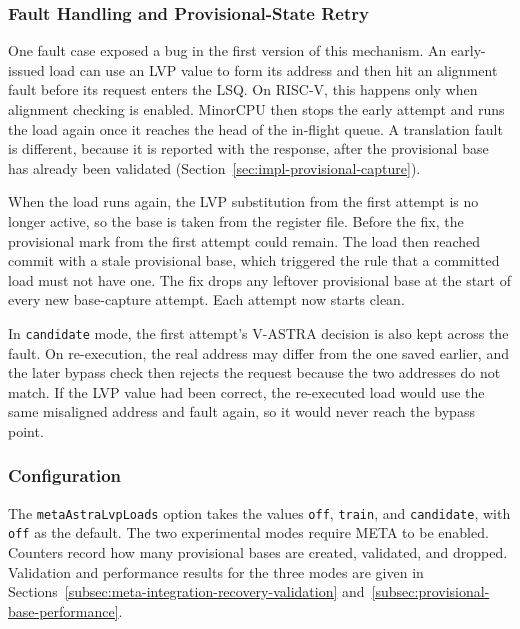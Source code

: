 \subsubsection{Fault Handling and Provisional-State Retry}

One fault case exposed a bug in the first version of this mechanism.
An early-issued load can use an LVP value to form its address and then
hit an alignment fault before its request enters the LSQ. On RISC-V,
this happens only when alignment checking is enabled. MinorCPU then
stops the early attempt and runs the load again once it reaches the
head of the in-flight queue. A translation fault is different,
because it is reported with the response, after the provisional base
has already been validated (Section~\ref{sec:impl-provisional-capture}).

When the load runs again, the LVP substitution from the first attempt
is no longer active, so the base is taken from the register file.
Before the fix, the provisional mark from the first attempt could
remain. The load then reached commit with a stale provisional base,
which triggered the rule that a committed load must not have one. The
fix drops any leftover provisional base at the start of every new
base-capture attempt. Each attempt now starts clean.

In \texttt{candidate} mode, the first attempt's V-ASTRA decision is
also kept across the fault. On re-execution, the real address may
differ from the one saved earlier, and the later bypass check then
rejects the request because the two addresses do not match. If the LVP
value had been correct, the re-executed load would use the same
misaligned address and fault again, so it would never reach the
bypass point.

\subsubsection{Configuration}

The \texttt{metaAstraLvpLoads} option takes the values \texttt{off},
\texttt{train}, and \texttt{candidate}, with \texttt{off} as the
default. The two experimental modes require META to be enabled.
Counters record how many provisional bases are created, validated,
and dropped. Validation and performance results for the three modes
are given in Sections~\ref{subsec:meta-integration-recovery-validation}
and~\ref{subsec:provisional-base-performance}.
